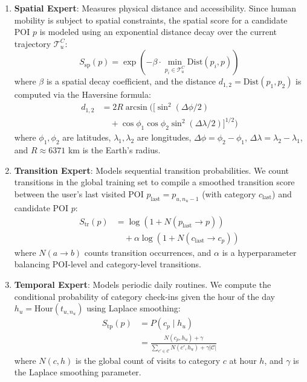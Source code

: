 \documentclass[10pt,twocolumn]{article}
\begin{document}
\begin{enumerate}
    \item \textbf{Spatial Expert}: Measures physical distance and accessibility. Since human mobility is subject to spatial constraints, the spatial score for a candidate POI $p$ is modeled using an exponential distance decay over the current trajectory $\mathcal{T}^C_u$:
    \begin{equation}
        S_{\mathrm{sp}}(p) = \exp\left( - \beta \cdot \min_{p_i \in \mathcal{T}^C_u} \mathrm{Dist}(p_i, p) \right)
    \end{equation}
    where $\beta$ is a spatial decay coefficient, and the distance $d_{1,2} = \mathrm{Dist}(p_1, p_2)$ is computed via the Haversine formula:
    \begin{equation}
    \begin{aligned}
        d_{1,2} &= 2R \arcsin \Big( \Big[ \sin^2(\Delta \phi / 2) \\
        &\quad + \cos\phi_1 \cos\phi_2 \sin^2(\Delta \lambda / 2) \Big]^{1/2} \Big)
    \end{aligned}
    \end{equation}
    where $\phi_1, \phi_2$ are latitudes, $\lambda_1, \lambda_2$ are longitudes, $\Delta \phi = \phi_2 - \phi_1$, $\Delta \lambda = \lambda_2 - \lambda_1$, and $R \approx 6371$ km is the Earth's radius.
    
    \item \textbf{Transition Expert}: Models sequential transition probabilities. We count transitions in the global training set to compile a smoothed transition score between the user's last visited POI $p_{\text{last}} = p_{u, n_u-1}$ (with category $c_{\text{last}}$) and candidate POI $p$:
    \begin{equation}
    \begin{aligned}
        S_{\mathrm{tr}}(p) &= \log\left(1 + N(p_{\mathrm{last}} \rightarrow p)\right) \\
        &\quad + \alpha \log\left(1 + N(c_{\mathrm{last}} \rightarrow c_p)\right)
    \end{aligned}
    \end{equation}
    where $N(a \rightarrow b)$ counts transition occurrences, and $\alpha$ is a hyperparameter balancing POI-level and category-level transitions.
    
    \item \textbf{Temporal Expert}: Models periodic daily routines. We compute the conditional probability of category check-ins given the hour of the day $h_u = \mathrm{Hour}(t_{u, n_u})$ using Laplace smoothing:
    \begin{equation}
    \begin{aligned}
        S_{\mathrm{tp}}(p) &= P(c_p \mid h_u) \\
        &= \frac{N(c_p, h_u) + \gamma}{\sum_{c' \in \mathcal{C}} N(c', h_u) + \gamma |\mathcal{C}|}
    \end{aligned}
    \end{equation}
    where $N(c, h)$ is the global count of visits to category $c$ at hour $h$, and $\gamma$ is the Laplace smoothing parameter.
    

\end{enumerate}
\end{document}
